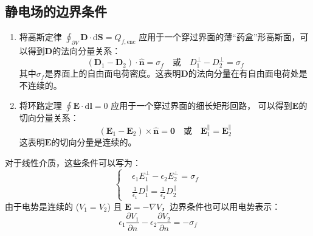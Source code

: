 \documentclass[fontset=none]{ctexart}
\begin{document}
\subsection{静电场的边界条件}
\begin{enumerate}
    \item 将高斯定律 $\oint_{\partial V} \bm{D} \cdot \mathrm{d}\bm{S} = Q_{f, \text{enc}}$ 
    应用于一个穿过界面的薄“药盒”形高斯面，可以得到$\bm{D}$的法向分量关系：
    \begin{equation}
        (\bm{D}_1 - \bm{D}_2) \cdot \hat{\bm{n}} 
        = \sigma_f \quad \text{或} \quad D_{1}^{\perp} - D_{2}^{\perp} = \sigma_f
    \end{equation}
    其中$\sigma_f$是界面上的自由面电荷密度。这表明$\bm{D}$的法向分量在有自由面电荷处是不连续的。
    \item 将环路定理 $\oint \bm{E} \cdot \mathrm{d}\bm{l} = 0$ 应用于一个穿过界面的细长矩形回路，
    可以得到$\bm{E}$的切向分量关系：
    \begin{equation}
        (\bm{E}_1 - \bm{E}_2) \times \hat{\bm{n}} 
        = \bm{0} \quad \text{或} \quad \bm{E}_{1}^{\parallel} = \bm{E}_{2}^{\parallel}
    \end{equation}
    这表明$\bm{E}$的切向分量是连续的。
\end{enumerate}
对于线性介质，这些条件可以写为：
\begin{equation}
    \left\{
    \begin{aligned}
    &\epsilon_1 E_{1}^{\perp} - \epsilon_2 E_{2}^{\perp} = \sigma_f \\
    &\frac{1}{\epsilon_1}D_{1}^{\parallel} = \frac{1}{\epsilon_2}D_{2}^{\parallel}
    \end{aligned}
    \right.
\end{equation}
由于电势是连续的 ($V_1 = V_2$) 且 $\bm{E} = -\nabla V$，边界条件也可以用电势表示：
\begin{equation}
    \epsilon_1 \frac{\partial V_1}{\partial n} - \epsilon_2 \frac{\partial V_2}{\partial n} = -\sigma_f
\end{equation}
\end{document}
